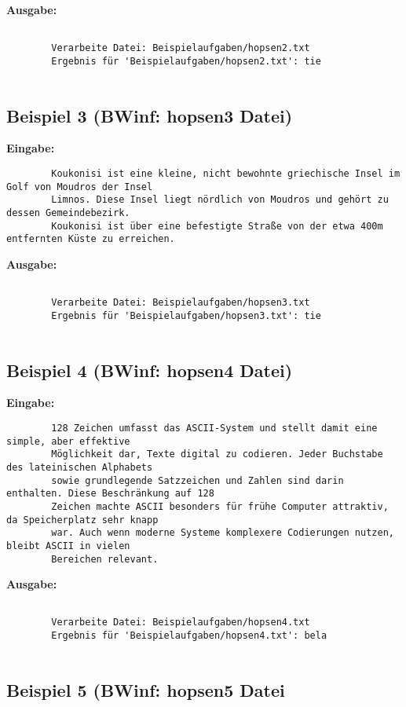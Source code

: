 \documentclass[a4paper,10pt,ngerman]{scrartcl}
\begin{document}
	\textbf{Ausgabe:}
	\begin{verbatim}
		
		Verarbeite Datei: Beispielaufgaben/hopsen2.txt
		Ergebnis für 'Beispielaufgaben/hopsen2.txt': tie
		
	\end{verbatim}
	
	\subsection{Beispiel 3 (BWinf: hopsen3 Datei)}
	\textbf{Eingabe:}
	\begin{verbatim}
		Koukonisi ist eine kleine, nicht bewohnte griechische Insel im Golf von Moudros der Insel 
		Limnos. Diese Insel liegt nördlich von Moudros und gehört zu dessen Gemeindebezirk. 
		Koukonisi ist über eine befestigte Straße von der etwa 400m entfernten Küste zu erreichen.
	\end{verbatim}
	
	\textbf{Ausgabe:}
	\begin{verbatim}
		
		Verarbeite Datei: Beispielaufgaben/hopsen3.txt
		Ergebnis für 'Beispielaufgaben/hopsen3.txt': tie
		
	\end{verbatim}
	
	\subsection{Beispiel 4 (BWinf: hopsen4 Datei)}
	\textbf{Eingabe:}
	\begin{verbatim}
		128 Zeichen umfasst das ASCII-System und stellt damit eine simple, aber effektive 
		Möglichkeit dar, Texte digital zu codieren. Jeder Buchstabe des lateinischen Alphabets 
		sowie grundlegende Satzzeichen und Zahlen sind darin enthalten. Diese Beschränkung auf 128 
		Zeichen machte ASCII besonders für frühe Computer attraktiv, da Speicherplatz sehr knapp 
		war. Auch wenn moderne Systeme komplexere Codierungen nutzen, bleibt ASCII in vielen 
		Bereichen relevant.
	\end{verbatim}
	
	\textbf{Ausgabe:}
	\begin{verbatim}
		
		Verarbeite Datei: Beispielaufgaben/hopsen4.txt
		Ergebnis für 'Beispielaufgaben/hopsen4.txt': bela
		
	\end{verbatim}
	
	\subsection{Beispiel 5 (BWinf: hopsen5 Datei}
	
\end{document}
